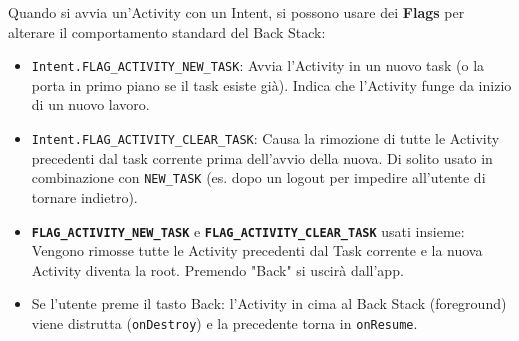Quando si avvia un'Activity con un Intent, si possono usare dei \textbf{Flags} per alterare il comportamento standard del Back Stack:
\begin{itemize}
    \item \texttt{Intent.FLAG\_ACTIVITY\_NEW\_TASK}: Avvia l'Activity in un nuovo task (o la porta in primo piano se il task esiste già).
    Indica che l'Activity funge da inizio di un nuovo lavoro.
    \item \texttt{Intent.FLAG\_ACTIVITY\_CLEAR\_TASK}: Causa la rimozione di tutte le Activity precedenti dal task corrente prima dell'avvio della nuova.
    Di solito usato in combinazione con \texttt{NEW\_TASK} (es. dopo un logout per impedire all'utente di tornare indietro).
\end{itemize}

\begin{center}
\end{center}

\begin{tcolorbox}[colback=white,colframe=black,title=Comportamento dei Flag (Domande Quiz)]
    \begin{itemize}
        \item \textbf{\texttt{FLAG\_ACTIVITY\_NEW\_TASK}} e \textbf{\texttt{FLAG\_ACTIVITY\_CLEAR\_TASK}} usati insieme: Vengono rimosse tutte le Activity precedenti dal Task corrente e la nuova Activity diventa la root.
        Premendo "Back" si uscirà dall'app.
        \item Se l'utente preme il tasto Back: l'Activity in cima al Back Stack (foreground) viene distrutta (\texttt{onDestroy}) e la precedente torna in \texttt{onResume}.
    \end{itemize}
\end{tcolorbox}